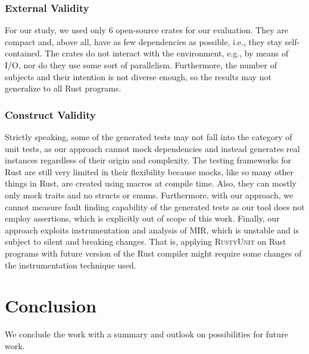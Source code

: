 \documentclass[paper=a4,%
  twoside,%
  BCOR4mm,%
  abstract=true,%
  toc=bibliography,%
  chapterprefix=true,%
  toc=bibliographynumbered,%
  open=right,%
  english,%
  pagesize=pdftex]{scrreprt}
\newcommand{\benchnum}{6\xspace}
\newcommand{\tech}{\textsc{RustyUnit}\xspace}
\newcommand{\mir}{\ac{MIR}\xspace}
\begin{document}
\subsection*{External Validity}
For our study, we used only \benchnum open-source crates for our evaluation. They are compact and, above all, have as few dependencies as possible, i.e., they stay self-contained. The crates do not interact with the environment, e.g., by means of I/O, nor do they use some sort of parallelism. Furthermore, the number of subjects and their intention is not diverse enough, so the results may not generalize to all Rust programs.

\subsection*{Construct Validity}
Strictly speaking, some of the generated tests may not fall into the category of unit tests, as our approach cannot mock dependencies and instead generates real instances regardless of their origin and complexity. The testing frameworks for Rust are still very limited in their flexibility because mocks, like so many other things in Rust, are created using macros at compile time. Also, they can mostly only mock traits and no structs or enums. Furthermore, with our approach, we cannot measure fault finding capability of the generated tests as our tool does not employ assertions, which is explicitly out of scope of this work. Finally, our approach exploits instrumentation and analysis of \mir, which is unstable and is subject to silent and breaking changes. That is, applying \tech on Rust programs with future version of the Rust compiler might require some changes of the instrumentation technique used.

\chapter{Conclusion}
\label{chap:conclusion}
We conclude the work with a summary and outlook on possibilities for future work.
\end{document}

